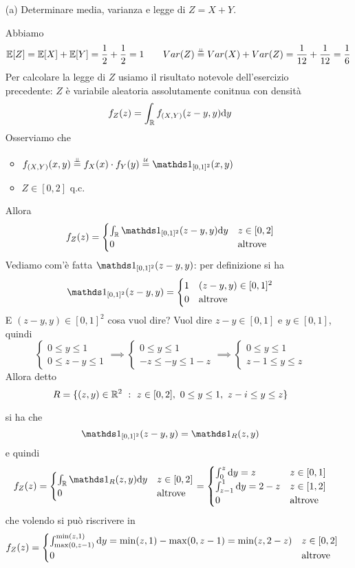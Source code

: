 \Soluzione{}
\begin{enumerate}
\item [(a)] Determinare media, varianza e legge di $Z=X+Y$.

Abbiamo
\[
\mathbb{E}[Z]=\mathbb{E}[X]+\mathbb{E}[Y]=\frac{1}{2}+\frac{1}{2}=1\qquad Var(Z)\overset{\underset{\perp \!\!\! \perp}{}}{=}Var(X)+Var(Z)=\frac{1}{12}+\frac{1}{12}=\frac{1}{6}
\]
Per calcolare la legge di $Z$ usiamo il risultato notevole dell'esercizio precedente: $Z$ è variabile aleatoria assolutamente conitnua con densità
\[
f_Z(z)=\int_{\mathbb{R}} f_{(X,Y)}(z-y,y)\mathrm{d} y
\]
Osserviamo che
\begin{itemize}
\item $\fXYxy\overset{\underset{\indep}{}}{=}f_X(x)\cdot f_Y(y)\overset{\underset{\Uc}{}}{=}\Ind_{[0,1]^2}(x,y)$
\item $Z\in[0,2]$ q.c.
\end{itemize}
Allora
\[
f_Z(z)=
\begin{cases}
\int_\RR\Ind_{[0,1]^2}(z-y,y)\dy &z\in[0,2] \\
0 &\text{altrove}
\end{cases}
\]
Vediamo com'è fatta $\Ind_{[0,1]^2}(z-y,y)$: per definizione si ha
\[
\Ind_{[0,1]^2}(z-y,y)=
\begin{cases}
1 &(z-y,y)\in[0,1]^2 \\
0 &\text{altrove}
\end{cases}
\]
E $(z-y,y)\in[0,1]^2$ cosa vuol dire? Vuol dire $z-y\in[0,1]$ e $y\in[0,1]$, quindi
\[
\begin{cases}
0\leq y\leq 1 \\
0\leq z-y \leq 1
\end{cases}
\implies
\begin{cases}
0\leq y\leq 1 \\
-z\leq -y \leq 1-z
\end{cases}
\implies
\begin{cases}
0\leq y\leq 1 \\
z-1\leq y \leq z
\end{cases}
\]
Allora detto 
\[
R=\{(z,y)\in\RR^2\ :\ z\in[0,2],\ 0\leq y\leq 1,\ z-i\leq y\leq z  \}
\]


si ha che
\[
\Ind_{[0,1]^2}(z-y,y)=\Ind_R(z,y)
\]
e quindi
\[
f_Z(z)=
\begin{cases}
\int_\RR\Ind_R(z,y)\dy &z\in[0,2] \\
0 &\text{altrove}
\end{cases}
=
\begin{cases}
\int_0^z\dy=z &z\in[0,1] \\
\int_{z-1}^1\dy=2-z  &z\in[1,2] \\
0 &\text{altrove}
\end{cases}
\]
che volendo si può riscrivere in
\[
f_Z(z)=
\begin{cases}
\int_{\max(0,z-1)}^{\min(z,1)}\mathrm{d} y=\min(z,1)-\max(0,z-1)=\min(z,2-z) &z\in[0,2] \\
0 &\text{altrove}
\end{cases}
\]


\end{enumerate}
